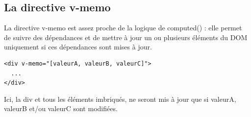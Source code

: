\documentclass{article}
\begin{document}
\subsection{La directive v-memo}
La directive {\color{monOrange}v-memo} est assez proche de la logique de {\color{monOrange}computed()} : elle permet de suivre des dépendances et de mettre à jour un ou plusieurs éléments du DOM uniquement si ces dépendances sont mises à jour.
\begin{verbatim}
<div v-memo="[valeurA, valeurB, valeurC]">
  ...
</div>
\end{verbatim}
Ici, la {\color{monOrange}div} et tous les éléments imbriqués, ne seront mis à jour que si {\color{monOrange}valeurA, valeurB} et/ou {\color{monOrange}valeurC} sont modifiées.

\end{document}
